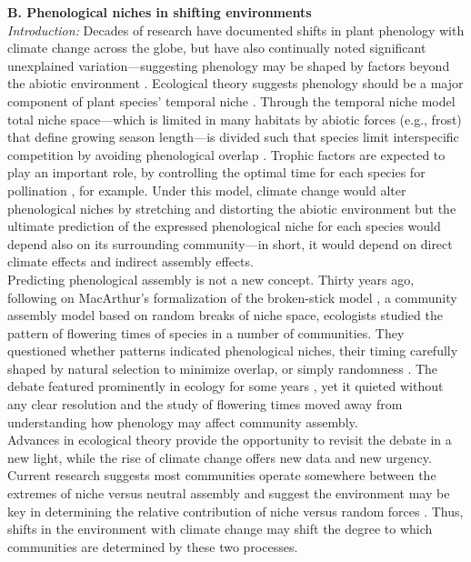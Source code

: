 \documentclass[12pt,a4paper,oneside]{article}
\begin{document}
{\bf B. Phenological niches in shifting environments}
\vspace{1.5ex}\\
\emph{Introduction:} Decades of research have documented shifts in plant phenology with climate change across the globe, but have also continually noted significant unexplained variation---suggesting phenology may be shaped by factors beyond the abiotic environment \citep{Pau:2011wd}. Ecological theory suggests phenology should be a major component of plant species' temporal niche \citep{gotelli1996}. Through the temporal niche model total niche space---which is limited in many habitats by abiotic forces (e.g., frost) that define growing season length---is divided such that species limit interspecific competition by avoiding phenological overlap \citep{Pau:2011wd,tansley}. Trophic factors are expected to play an important role, by controlling the optimal time for each species for pollination \citep{Brody:1997ro}, for example. Under this model, climate change would alter phenological niches by stretching and distorting the abiotic environment but the ultimate prediction of the expressed phenological niche for each species would depend also on its surrounding community---in short, it would depend on direct climate effects and indirect assembly effects.
\vspace{1.5ex}\\
Predicting phenological assembly is not a new concept. Thirty years ago, following on MacArthur's formalization of the broken-stick model \citep{MACARTHUR:1957gf}, a community assembly model based on random breaks of niche space, ecologists studied the pattern of flowering times of species in a number of communities. They questioned whether patterns indicated phenological niches, their timing carefully shaped by natural selection to minimize overlap, or simply randomness \citep{poole1979,Cole:1981il}. The debate featured prominently in ecology for some years \citep{Gleeson:1981wh,Fleming:1984hu}, yet it quieted without any clear resolution and the study of flowering times moved away from understanding how phenology may affect community assembly. 
\vspace{1.5ex}\\
Advances in ecological theory provide the opportunity to revisit the debate in a new light, while the rise of climate change offers new data and new urgency. Current research suggests most communities operate somewhere between the extremes of niche versus neutral assembly  \citep{Chase:2007yt,ellwood2009} and suggest the environment may be key in determining the relative contribution of niche versus random forces \citep{chase2011}. Thus, shifts in the environment with climate change may shift the degree to which communities are determined by these two processes.
\end{document}
